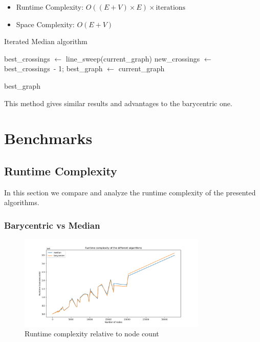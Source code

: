 \documentclass[a4paper]{article}
\begin{document}
\begin{itemize}
	\item Runtime Complexity: $O((E + V) \times E) \times \text{iterations}$
	\item Space Complexity: $O(E + V)$\\
\end{itemize}

\begin{algorithm}
	\caption{Iterated Median algorithm}
	\DontPrintSemicolon
	\BlankLine

	best\_crossings $\gets$ line\_sweep(current\_graph)\;
	new\_crossings $\gets$ best\_crossings\ - 1;
	best\_graph $\gets$ current\_graph\;
	\BlankLine


	\Return best\_graph\;
\end{algorithm}

This method gives similar results and advantages to the barycentric one.

\eject

\section{Benchmarks}

\subsection{Runtime Complexity}

In this section we compare and analyze the runtime complexity of the presented algorithms.

\subsubsection*{Barycentric vs Median}

\begin{figure}[ht]
	\centering
	\includegraphics[width=0.8\textwidth]{images/node_runtime_complexity.png}
	\caption{Runtime complexity relative to node count}
\end{figure}
\end{document}

